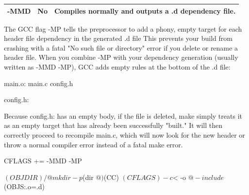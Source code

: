 \documentclass{report}
\begin{document}
\begin{itemize}
\begin{center}
\begin{tabularx}{\textwidth}{@{}llX@{}}
                    -MMD& No &Compiles normally and outputs a .d dependency file. \\
                    \bottomrule
                \end{tabularx}
            \end{center}
            The GCC flag -MP tells the preprocessor to add a phony, empty target for each header file dependency in the generated .d file
            \bigbreak \noindent 
            This prevents your build from crashing with a fatal "No such file or directory" error if you delete or rename a header file.
            \bigbreak \noindent 
            When you combine -MP with your dependency generation (usually written as -MMD -MP), GCC adds empty rules at the bottom of the .d file:
            \bigbreak \noindent 
            \begin{bashcode}
            main.o: main.c config.h

            config.h:
            \end{bashcode}
            \bigbreak \noindent 
            Because config.h: has an empty body, if the file is deleted, make simply treats it as an empty target that has already been successfully "built." It will then correctly proceed to recompile main.c, which will now look for the new header or throw a normal compiler error instead of a fatal make error.
            \bigbreak \noindent 
            \begin{bashcode}
            CFLAGS += -MMD -MP

            $(OBJDIR)/%
                @mkdir -p $(dir $@)
                $(CC) $(CFLAGS) -c $< -o $@

            -include $(OBJS:.o=.d)
            \end{bashcode}


    \end{itemize}
\end{document}
